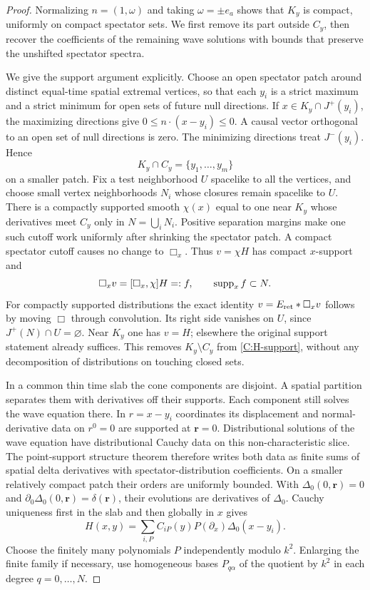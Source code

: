 \begin{proof}
Normalizing $n=(1,\omega)$ and taking $\omega=\pm e_a$ shows that
$K_y$ is compact, uniformly on compact spectator sets. We first remove
its part outside $C_y$, then recover the coefficients of the remaining
wave solutions with bounds that preserve the unshifted spectator spectra.

We give the support argument explicitly. Choose an open spectator
patch around distinct equal-time spatial extremal vertices, so that
each $y_i$ is a strict maximum and a strict minimum for open sets of
future null directions. If $x\in K_y\cap J^+(y_i)$, the maximizing
directions give $0\le n\cdot(x-y_i)\le0$. A causal vector orthogonal
to an open set of null directions is zero. The minimizing directions
treat $J^-(y_i)$. Hence
\begin{equation}\label{C:vertex-intersection}
 K_y\cap C_y=\{y_1,\ldots,y_m\}
\end{equation}
on a smaller patch. Fix a test neighborhood $U$ spacelike to all the
vertices, and choose small vertex neighborhoods $N_i$ whose closures
remain spacelike to $U$. There is a compactly supported smooth
$\chi(x)$ equal to one near $K_y$ whose derivatives meet $C_y$ only
in $N=\bigcup_iN_i$. Positive separation margins make one such cutoff
work uniformly after shrinking the spectator patch. A compact
spectator cutoff causes no change to $\Box_x$. Thus $v=\chi H$ has
compact $x$-support and
\[
 \Box_xv=[\Box_x,\chi]H=:f,\qquad \operatorname{supp}_xf\subset N.
\]
For compactly supported distributions the exact identity
$v=E_{\rm ret}*\Box_xv$ follows by moving $\Box$ through convolution.
Its right side vanishes on $U$, since $J^+(N)\cap U=\varnothing$.
Near $K_y$ one has $v=H$; elsewhere the original support statement
already suffices. This removes $K_y\setminus C_y$ from
\eqref{C:H-support}, without any decomposition of distributions on
touching closed sets.

In a common thin time slab the cone components are disjoint.
A spatial partition separates them with derivatives off their
supports. Each component still solves the wave equation there.
In $r=x-y_i$ coordinates its displacement and normal-derivative data
on $r^0=0$ are supported at $\boldsymbol r=0$. Distributional
solutions of the wave equation have distributional Cauchy data on
this non-characteristic slice. The point-support structure theorem
therefore writes both data as finite sums of spatial delta
derivatives with spectator-distribution coefficients. On a smaller
relatively compact patch their orders are uniformly bounded.
With $\Delta_0(0,\boldsymbol r)=0$ and
$\partial_0\Delta_0(0,\boldsymbol r)=\delta(\boldsymbol r)$,
their evolutions are derivatives of $\Delta_0$. Cauchy uniqueness
first in the slab and then globally in $x$ gives
\begin{equation}\label{C:vertex-wave-expansion}
 H(x,y)=\sum_{i,P}C_{iP}(y)P(\partial_x)\Delta_0(x-y_i).
\end{equation}
Choose the finitely many polynomials $P$ independently modulo $k^2$.
Enlarging the finite family if necessary, use homogeneous bases
$P_{q\alpha}$ of the quotient by $k^2$ in each degree
$q=0,\ldots,N$.


\end{proof}
